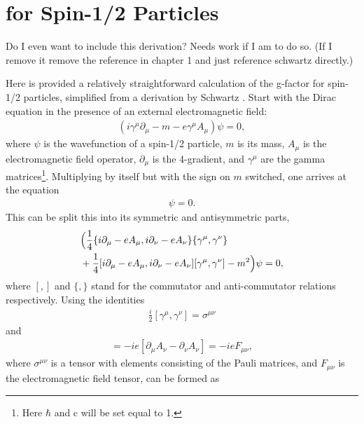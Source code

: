 
\thispagestyle{myheadings}

\chapter{\g for Spin-1/2 Particles}
\label{gDirac}

Do I even want to include this derivation? Needs work if I am to do so. (If I remove it remove the reference in chapter 1 and just reference schwartz directly.)

Here is provided a relatively straightforward calculation of the g-factor for spin-1/2 particles, simplified from a derivation by Schwartz \cite{Schwartz}. Start with the Dirac equation in the presence of an external electromagnetic field: 
	\begin{align}
		(i\gamma^{\mu}\partial_{\mu} - m -e \gamma^{\mu}A_{\mu})\psi = 0,
	\label{eq:dirac}
	\end{align}
where $\psi$ is the wavefunction of a spin-1/2 particle, $m$ is its mass, $A_{\mu}$ is the electromagnetic field operator, $\partial_{\mu}$ is the 4-gradient, and $\gamma^{\mu}$ are the gamma matrices\footnote{Here $\hbar$ and c will be set equal to 1.}. Multiplying  by itself but with the sign on $m$ switched, one arrives at the equation
	\begin{align}
		[(i\partial_{\mu}-eA_{\mu})(i\partial_{\nu}-eA_{\nu})\gamma^{\mu}\gamma^{\nu} - m^{2}]\psi = 0.
	\end{align}
This can be split this into its symmetric and antisymmetric parts,
	\begin{align}
		&\Big(\frac{1}{4}\{i\partial_{\mu}-eA_{\mu},i\partial_{\nu}-eA_{\nu}\}\{\gamma^{\mu}, \gamma^{\nu}\} \notag \\
		&+\frac{1}{4}[i\partial_{\mu}-eA_{\mu},i\partial_{\nu}-eA_{\nu}][\gamma^{\mu}, \gamma^{\nu}] - m^{2}\Big)\psi = 0,
	\label{eq:symmantisymm}
	\end{align}
where $[,]$ and $\{,\}$ stand for the commutator and anti-commutator relations respectively. Using the identities 
	\begin{align}
		\frac{i}{2}[\gamma^{\mu}, \gamma^{\nu}] = \sigma^{\mu\nu}
	\end{align}
and
	\begin{align}
		[i\partial_{\mu}-eA_{\mu},i\partial_{\nu}-eA_{\nu}] = -ie[\partial_{\mu}A_{\nu} - \partial_{\nu}A_{\nu}] = -ie F_{\mu\nu},
	\end{align}
where $\sigma^{\mu\nu}$ is a tensor with elements consisting of the Pauli matrices, and $F_{\mu\nu}$ is the electromagnetic field tensor,  can be formed as
